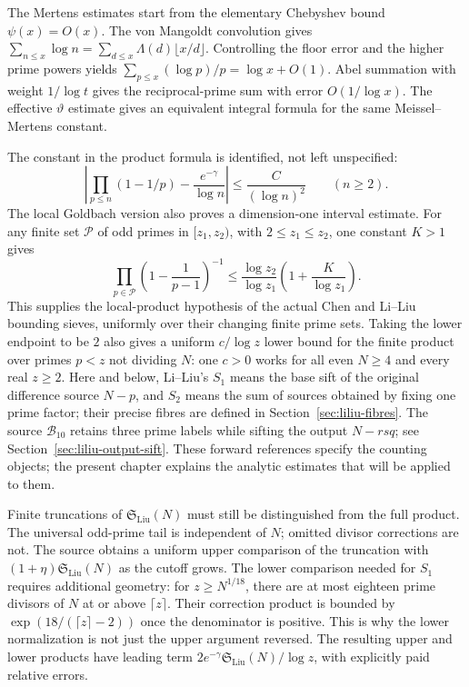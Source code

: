 The Mertens estimates start from the elementary Chebyshev bound $\psi(x)=O(x)$.
The von Mangoldt convolution gives
$\sum_{n\le x}\log n=\sum_{d\le x}\Lambda(d)\lfloor x/d\rfloor$.
Controlling the floor error and the higher prime powers yields
$\sum_{p\le x}(\log p)/p=\log x+O(1)$.
Abel summation with weight $1/\log t$ gives the reciprocal-prime sum with
error $O(1/\log x)$. The effective $\vartheta$ estimate gives an equivalent
integral formula for the same Meissel--Mertens constant.

The constant in the product formula is identified, not left unspecified:
\[
 \left|\prod_{p\le n}(1-1/p)-\frac{e^{-\gamma}}{\log n}\right|
 \le \frac{C}{(\log n)^2}\qquad(n\ge2).
\]
The local Goldbach version also proves a dimension-one interval estimate.
For any finite set $\mathcal P$ of odd primes in $[z_1,z_2)$, with
$2\le z_1\le z_2$, one constant $K>1$ gives
\[
 \prod_{p\in\mathcal P}\left(1-\frac1{p-1}\right)^{-1}
 \le \frac{\log z_2}{\log z_1}\left(1+\frac K{\log z_1}\right).
\]
This supplies the local-product hypothesis of the actual Chen and Li--Liu
bounding sieves, uniformly over their changing finite prime sets.
Taking the lower endpoint to be $2$ also gives a uniform $c/\log z$ lower
bound for the finite product over primes $p<z$ not dividing $N$: one $c>0$
works for all even $N\ge4$ and every real $z\ge2$.
Here and below, Li--Liu's $S_1$ means the base sift of the original difference
source $N-p$, and $S_2$ means the sum of sources obtained by fixing one prime
factor; their precise fibres are defined in Section~\ref{sec:liliu-fibres}.
The source $\mathcal B_{10}$ retains three prime labels while sifting the
output $N-rsq$; see Section~\ref{sec:liliu-output-sift}.
These forward references specify the counting objects; the present chapter
explains the analytic estimates that will be applied to them.

Finite truncations of $\mathfrak S_{\mathrm{Liu}}(N)$ must still be distinguished from the full
product. The universal odd-prime tail is independent of $N$; omitted divisor
corrections are not. The source obtains a uniform upper comparison of the
truncation with $(1+\eta)\mathfrak S_{\mathrm{Liu}}(N)$ as the cutoff grows.
The lower comparison needed for $S_1$ requires additional geometry:
for $z\ge N^{1/18}$, there are at most eighteen prime divisors of $N$
at or above $\lceil z\rceil$.
Their correction product is bounded by
$\exp(18/(\lceil z\rceil-2))$ once the denominator is positive.
This is why the lower normalization is not just the upper argument reversed.
The resulting upper and lower products have leading term
$2e^{-\gamma}\mathfrak S_{\mathrm{Liu}}(N)/\log z$, with explicitly paid relative errors.

